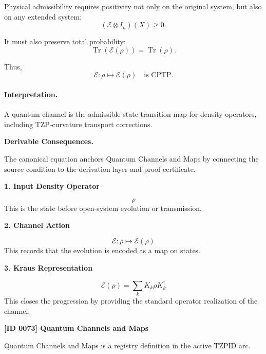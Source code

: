Physical admissibility requires positivity not only on the original system, but also on any extended system:
\begin{equation}
(\mathcal{E}\otimes I_n)(X)\geq 0 .
\end{equation}

It must also preserve total probability:
\begin{equation}
\operatorname{Tr}(\mathcal{E}(\rho))=\operatorname{Tr}(\rho).
\end{equation}

Thus,
\begin{equation}
\boxed{
\mathcal{E}:\rho\mapsto\mathcal{E}(\rho)
\quad
\text{is CPTP}.
}
\end{equation}

\paragraph{Interpretation.}
A quantum channel is the admissible state-transition map for density operators, including TZP-curvature transport corrections.

\par\vspace{0.35em}
\noindent\textbf{Derivable Consequences.}\quad
\begingroup
\footnotesize
\raggedright
The canonical equation anchors Quantum Channels and Maps by connecting the source condition to the derivation layer and proof certificate.
\par\endgroup

\noindent\textbf{1. Input Density Operator}\par
\[
\rho
\]
\noindent This is the state before open-system evolution or transmission.\par
\noindent\textbf{2. Channel Action}\par
\[
\mathcal{E}:\rho \mapsto \mathcal{E}(\rho)
\]
\noindent This records that the evolution is encoded as a map on states.\par
\noindent\textbf{3. Kraus Representation}\par
\[
\mathcal{E}(\rho) = \sum_{k} K_{k}\rho K_{k}^{\dagger}
\]
\noindent This closes the progression by providing the standard operator realization of the channel.\par

\clearpage
\noindent\textbf{[ID 0073] Quantum Channels and Maps}\par
\vspace{0.35em}
\begingroup\small
{}
Quantum Channels and Maps is a registry definition in the active TZPID arc.

